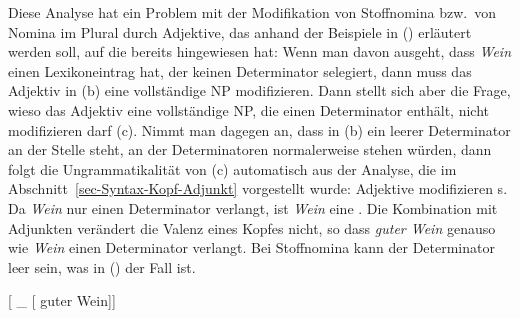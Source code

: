 Diese Analyse hat ein Problem mit der Modifikation von Stoffnomina bzw.\ von Nomina im Plural durch
Adjektive, das anhand der Beispiele in () erläutert werden soll, auf die bereits \citet[]{Netter94} hingewiesen hat:
\eal
{}
\zl 
Wenn man davon ausgeht, dass \emph{Wein} einen Lexikoneintrag hat, der keinen Determinator selegiert,
dann muss das Adjektiv in (b) eine vollständige NP modifizieren. Dann stellt sich aber die
Frage, wieso das Adjektiv eine vollständige NP, die einen Determinator enthält, nicht modifizieren
darf (c). Nimmt man dagegen an, dass in (b) ein leerer Determinator an der Stelle
steht, an der Determinatoren normalerweise stehen würden, dann folgt die Ungrammatikalität von
(c) automatisch aus der Analyse, die im Abschnitt~\ref{sec-Syntax-Kopf-Adjunkt} vorgestellt
wurde: Adjektive modifizieren \nbar{}s. Da \emph{Wein} nur einen Determinator verlangt, ist \emph{Wein} eine
\nbar. Die Kombination mit Adjunkten verändert die Valenz eines Kopfes nicht, so dass \emph{guter
  Wein} genauso wie \emph{Wein} einen Determinator verlangt. Bei Stoffnomina kann der Determinator
leer sein, was in () der Fall ist. 


\ea
{}[ \_ [\sub{\nbar} guter Wein]]
\z

